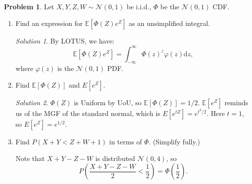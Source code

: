 \documentclass[11pt]{article}
\theoremstyle{definition}
\newtheorem{prob}[theo]{\color{Maroon} Problem}
\theoremstyle{remark}
\newtheorem*{soln}{\color{Maroon} Solution}
\newcommand{\E}[1]{\mathbb{E}\left[ #1 \right]}
\newcommand{\Norm}{\mathcal{N}}
\begin{document}
\begin{prob} Let $X,Y,Z,W \sim \Norm(0,1)$ be i.i.d., $\Phi$ be the $\Norm(0,1)$ CDF.

\begin{enumerate}[label = (\alph*)]
    \item Find an expression for $\E{\Phi(Z)e^Z}$ as an unsimplified integral.
    
    \begin{soln}
    By LOTUS, we have:
    \[
    \E{\Phi(Z)e^Z} = \int_{-\infty}^\infty \Phi(z)^{z}\varphi(z)\mathrm dz,
    \]
    where $\varphi(z)$ is the $\mathcal N(0, 1)$ PDF.
    \end{soln}
    
    \dotfill
    
    \item Find $\E{\Phi(Z)}$ and $E[e^Z]$.
    
    \begin{soln}
    $\Phi(Z)$ is Uniform by UoU, so $\E{\Phi(Z)} = 1/2$. $\E{e^Z}$ reminds us of the MGF of the standard normal, which is $E[e^{tZ}] = e^{t^2/2}$. Here $t = 1$, so $E[e^Z] = e^{1/2}$.
    \end{soln} 
    
    \dotfill
    
    \item Find $P(X + Y < Z + W + 1)$ in terms of $\Phi$. (Simplify fully.)
    
    Note that $X + Y - Z - W$ is distributed $\Norm(0, 4)$, so 
    \[
    P\left(\frac{X + Y - Z - W}{2} < \frac{1}{2}\right) = \Phi\left(\frac{1}{2}\right).
    \]
    
\end{enumerate}

\end{prob}

\pagebreak
\end{document}
